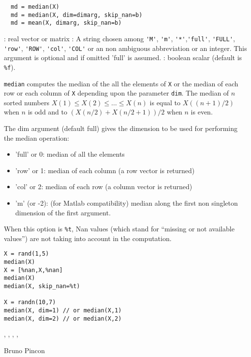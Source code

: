 
\begin{mandesc}
\end{mandesc}

\begin{calling_sequence}
\begin{verbatim}
  md = median(X)
  md = median(X, dim=dimarg, skip_nan=b)  
  md = mean(X, dimarg, skip_nan=b)  
\end{verbatim}
\end{calling_sequence}
\begin{parameters}
  \begin{varlist}
    : real vector or matrix
    : A string chosen among \verb+'M'+, \verb+'m'+, \verb+'*'+,\verb+'full'+, \verb+'FULL'+, \verb+'row'+,
    \verb+'ROW'+, \verb+'col'+, \verb+'COL'+ or an non ambiguous abbreviation or an integer. 
    This argument is optional and if omitted 'full' is assumed.
    : boolean scalar (default is \verb+%f+).
  \end{varlist}
\end{parameters}

\begin{mandescription}
  \verb+median+ computes the median of the all the elements of \verb+X+
or the median of each row or each column of \verb+X+ depending upon
the parameter \verb+dim+. The median of $n$ sorted numbers 
$X(1) \le X(2) \le \dots \le X(n)$ is equal to $X((n+1)/2)$ when $n$
is odd and to  $(X(n/2)+X(n/2+1))/2$ when $n$ is even.

  The dim argument (default full) gives the dimension to be used for performing the median operation:
  \begin{itemize}
    \item 'full' or 0: median of all the elements 
    \item 'row' or 1: median of each column (a row vector is returned)
    \item 'col' or 2: median of each row (a column vector is returned)
    \item 'm' (or -2): (for Matlab compatibility) median along the first non 
          singleton dimension of the first argument.
  \end{itemize}

   When this option is \verb+%t+,  Nan values (which stand for ``missing or not 
 available values'') are not taking into account in the computation.
\end{mandescription}
\begin{examples}
\begin{Verbatim}
X = rand(1,5)
median(X)
X = [%nan,X,%nan]
median(X)
median(X, skip_nan=%t) 

X = randn(10,7)
median(X, dim=1) // or median(X,1)
median(X, dim=2) // or median(X,2)
\end{Verbatim}
\end{examples}

\begin{manseealso}
   , , , , 
\end{manseealso}

\begin{authors}
 Bruno Pincon
\end{authors}
